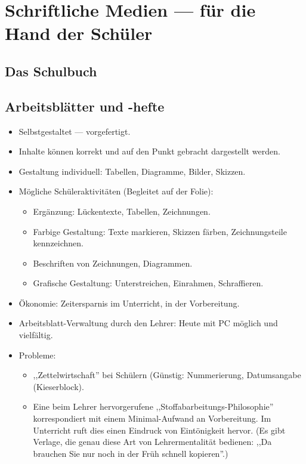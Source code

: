 \section{Schriftliche Medien --- f\"{u}r die Hand der Sch\"{u}ler}
\subsection{Das Schulbuch}

\subsection{Arbeitsbl\"{a}tter und -hefte}
\begin{itemize}
\item
Selbstgestaltet --- vorgefertigt.
\item
Inhalte k\"{o}nnen korrekt und auf den Punkt gebracht
dargestellt werden.
\item
Gestaltung individuell: Tabellen, Diagramme, Bilder, Skizzen.
\item
M\"{o}gliche Sch\"{u}leraktivit\"{a}ten (Begleitet auf der Folie):
\begin{itemize}
\item
Erg\"{a}nzung: L\"{u}ckentexte, Tabellen, Zeichnungen.
\item
Farbige Gestaltung: Texte markieren, Skizzen f\"{a}rben,
           Zeichnungs\-tei\-le kennzeichnen.
\item
Beschriften von Zeichnungen, Diagrammen.
\item
Grafische Gestaltung: Unterstreichen, Einrahmen, Schraffieren.
\end{itemize}

\item
\"{O}konomie: Zeitersparnis im Unterricht, in der Vorbereitung.
\item
Arbeitsblatt-Verwaltung durch den Lehrer:
Heute mit PC m\"{o}glich und vielf\"{a}ltig.

\item
Probleme:
\begin{itemize}
\item
,,Zettelwirtschaft'' bei Sch\"{u}lern (G\"{u}nstig: Nummerierung, Datumsangabe (Kieserblock).
\item
Eine beim Lehrer hervorgerufene ,,Stoffabarbeitungs-Philosophie''
korrespondiert mit einem Minimal-Aufwand an Vorbereitung.
Im Unterricht ruft dies einen Eindruck von Eint\"{o}nigkeit hervor.
(Es gibt Verlage, die genau diese Art von Lehrermentalit\"{a}t bedienen:
,,Da brauchen Sie nur noch in der Fr\"{u}h schnell kopieren''.)
\end{itemize}
\end{itemize}

